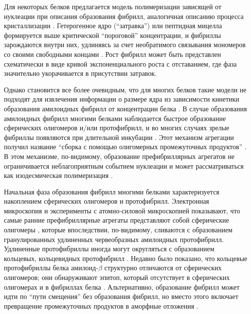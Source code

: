    Для некоторых белков предлагается модель полимеризации зависящей от нуклеации при описания образования фибрилл, аналогичная описанию процесса кристаллизации \cite{come_kinetic_1993}. Гетерогенное ядро (``затравка'') или пептидная мицелла формируется выше критической ``пороговой'' концентрации, и фибриллы зарождаются внутри них, удлиняясь за счет необратимого связывания мономеров со своими свободными концами \cite{lomakin_nucleation_1996,walsh_amyloid_1999}. Рост фибрилл может быть представлен схематически в виде кривой экспоненциального роста с отставанием, где фаза значительно укорачивается в присутствии затравок.
    
    Однако становится все более очевидным, что для многих белков такие модели не подходят для извлечения информации о размере ядра из зависимости кинетики образования амилоидных фибрилл от концентрации белка \cite{xue_systematic_2008}. В случае образования амилоидных фибрилл многими белками наблюдается быстрое образование сферических олигомеров и/или протофибрилл, и во многих случаях зрелые фибриллы появляются при длительной инкубации \cite{s_conformational_2008,mukhopadhyay_characterization_2006,apetri_secondary_2006,chimon_evidence_2007,goldsbury_multiple_2005,jain_evidence_2008,kumar_mechanism_2007}. Этот механизм агрегации получил название ``сборка с помощью олигомерных промежуточных продуктов'' \cite{s_conformational_2008,serio_nucleated_2000,modler_assembly_2003}. В этом механизме, по-видимому, образование префибриллярных агрегатов не ограничивается неблагоприятным событием нуклеации \cite{jain_evidence_2008,kumar_mechanism_2007,hurshman_transthyretin_2004} и может рассматриваться как изодесмическая полимеризация \cite{hurshman_transthyretin_2004}.
    
    Начальная фаза образования фибрилл многими белками характеризуется накоплением сферических олигомеров и протофибрилл. Электронная микроскопия и эксперименты с атомно-силовой микроскопией показывают, что самые ранние префибриллярные агрегаты представляют собой сферические олигомеры \cite{s_conformational_2008,mukhopadhyay_characterization_2006,apetri_secondary_2006,jain_evidence_2008,kumar_mechanism_2007,serio_nucleated_2000,modler_assembly_2003,hurshman_transthyretin_2004,carrotta_protofibril_2005,kad_hierarchical_2003}, которые впоследствии, по-видимому, сливаются с образованием гранулированных удлиненных червеобразных амилоидных протофибрилл. Удлиненные протофибриллы иногда могут округляться с образованием кольцевых, кольцевидных протофибрилл \cite{lashuel_alpha-synuclein_2002,lashuel_neurodegenerative_2002,kayed_annular_2009}. Недавно было показано, что кольцевые протофибриллы белка амилоид-$\beta$ структурно отличаются от сферических олигомеров; они обнаруживают эпитоп, который отсутствует в сферических олигомерах и в фибриллах белка \cite{kayed_annular_2009}. Альтернативно, образование фибрилл может идти по ``пути смещения'' без образования фибрилл, но вместо этого включает превращение промежуточных продуктов в аморфные отложения \cite{rambaran_amyloid_2008}.
    
